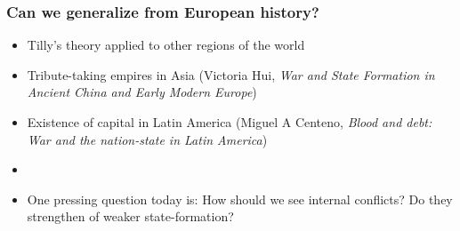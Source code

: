 \documentclass[utf8, xcolor=dvipsnames, handout]{beamer}
\begin{document}
\begin{frame}
\frametitle{Can we generalize from European history?}
\centering

\begin{itemize}[<+->]
  \item Tilly's theory applied to other regions of the world
  \item Tribute-taking empires in Asia (Victoria Hui, \textit{War and State Formation in Ancient China and Early Modern Europe})
  \item Existence of capital in Latin America (Miguel A Centeno, \textit{Blood and debt: War and the nation-state in Latin America})
  \item[]
  \item One pressing question today is: How should we see internal conflicts? Do they strengthen of weaker state-formation?
\end{itemize}

\end{frame}
\end{document}
